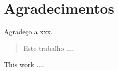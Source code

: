 \chapter*{Agradecimentos}
Agradeço a xxx.
\begin{abstract}
Este trabalho ....
\end{abstract}
\begin{englishabstract}
This work ....
\end{englishabstract}
